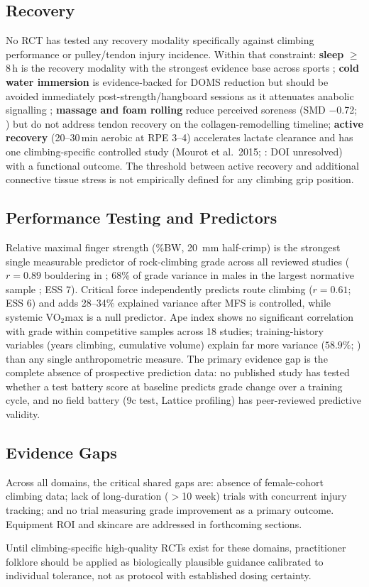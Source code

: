 \subsection*{Recovery}

No RCT has tested any recovery modality specifically against climbing performance or pulley/tendon injury incidence. Within that constraint: \textbf{sleep} $\geq$8\,h is the recovery modality with the strongest evidence base across sports \cite{MSB+14}; \textbf{cold water immersion} is evidence-backed for DOMS reduction but should be avoided immediately post-strength/hangboard sessions as it attenuates anabolic signalling \cite{RRM+15}; \textbf{massage and foam rolling} reduce perceived soreness (SMD $-$0.72; \cite{DDT+18}) but do not address tendon recovery on the collagen-remodelling timeline; \textbf{active recovery} (20--30\,min aerobic at RPE 3--4) accelerates lactate clearance and has one climbing-specific controlled study (Mourot et al.\ 2015; \toverify: DOI unresolved) with a functional outcome. The threshold between active recovery and additional connective tissue stress is not empirically defined for any climbing grip position.

\subsection*{Performance Testing and Predictors}

Relative maximal finger strength (\%BW, 20~mm half-crimp) is the strongest single measurable predictor of rock-climbing grade across all reviewed studies ($r = 0.89$ bouldering in \cite{BBW25}; 68\% of grade variance in males in the largest normative sample \cite{BMK+25}; ESS 7). Critical force independently predicts route climbing ($r = 0.61$; ESS 6) and adds 28--34\% explained variance after MFS is controlled, while systemic VO$_{2}$max is a null predictor. Ape index shows no significant correlation with grade within competitive samples across 18 studies; training-history variables (years climbing, cumulative volume) explain far more variance ($58.9\%$; \cite{MJPS00}) than any single anthropometric measure. The primary evidence gap is the complete absence of prospective prediction data: no published study has tested whether a test battery score at baseline predicts grade change over a training cycle, and no field battery (9c test, Lattice profiling) has peer-reviewed predictive validity.

\subsection*{Evidence Gaps}

Across all domains, the critical shared gaps are: absence of female-cohort climbing data; lack of long-duration ($>$10 week) trials with concurrent injury tracking; and no trial measuring grade improvement as a primary outcome. Equipment ROI and skincare are addressed in forthcoming sections.

Until climbing-specific high-quality RCTs exist for these domains, practitioner folklore should be applied as biologically plausible guidance calibrated to individual tolerance, not as protocol with established dosing certainty.

